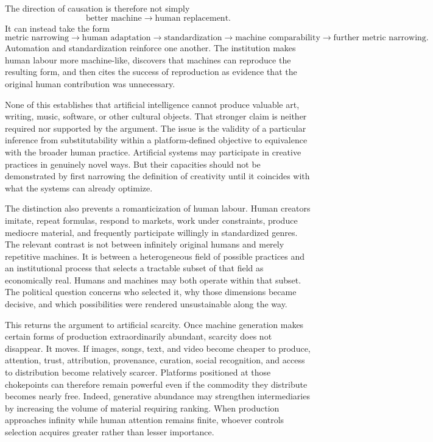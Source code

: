 \documentclass[11pt]{article}
\begin{document}
The direction of causation is therefore not simply
\[
\text{better machine} \longrightarrow \text{human replacement}.
\]
It can instead take the form
\[
\text{metric narrowing}
\longrightarrow
\text{human adaptation}
\longrightarrow
\text{standardization}
\longrightarrow
\text{machine comparability}
\longrightarrow
\text{further metric narrowing}.
\]
Automation and standardization reinforce one another. The institution makes human labour more machine-like, discovers that machines can reproduce the resulting form, and then cites the success of reproduction as evidence that the original human contribution was unnecessary.

None of this establishes that artificial intelligence cannot produce valuable art, writing, music, software, or other cultural objects. That stronger claim is neither required nor supported by the argument. The issue is the validity of a particular inference from substitutability within a platform-defined objective to equivalence with the broader human practice. Artificial systems may participate in creative practices in genuinely novel ways. But their capacities should not be demonstrated by first narrowing the definition of creativity until it coincides with what the systems can already optimize.

The distinction also prevents a romanticization of human labour. Human creators imitate, repeat formulas, respond to markets, work under constraints, produce mediocre material, and frequently participate willingly in standardized genres. The relevant contrast is not between infinitely original humans and merely repetitive machines. It is between a heterogeneous field of possible practices and an institutional process that selects a tractable subset of that field as economically real. Humans and machines may both operate within that subset. The political question concerns who selected it, why those dimensions became decisive, and which possibilities were rendered unsustainable along the way.

This returns the argument to artificial scarcity. Once machine generation makes certain forms of production extraordinarily abundant, scarcity does not disappear. It moves. If images, songs, text, and video become cheaper to produce, attention, trust, attribution, provenance, curation, social recognition, and access to distribution become relatively scarcer. Platforms positioned at those chokepoints can therefore remain powerful even if the commodity they distribute becomes nearly free. Indeed, generative abundance may strengthen intermediaries by increasing the volume of material requiring ranking. When production approaches infinity while human attention remains finite, whoever controls selection acquires greater rather than lesser importance.
\end{document}
